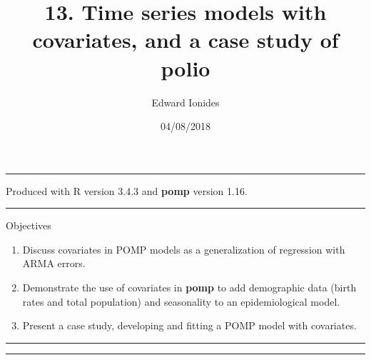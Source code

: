 \documentclass[]{article}
\title{13. Time series models with covariates, and a case study of polio}
\author{Edward Ionides}
\date{04/08/2018}
\begin{document}
\maketitle

{
\setcounter{tocdepth}{2}
\tableofcontents
}
\newcommand\prob{\mathbb{P}}
\newcommand\E{\mathbb{E}}
\newcommand\var{\mathrm{Var}}
\newcommand\cov{\mathrm{Cov}}
\newcommand\loglik{\ell}
\newcommand\R{\mathbb{R}}
\newcommand\data[1]{#1^*}
\newcommand\params{\, ; \,}
\newcommand\transpose{\scriptsize{T}}
\newcommand\eqspace{\quad\quad}
\newcommand\myeq[1]{\eqspace \displaystyle #1}
\newcommand\lik{\mathcal{L}}
\newcommand\profileloglik[1]{\ell^\mathrm{profile}_#1}
\newcommand\ar{\phi}
\newcommand\ma{\psi}
\newcommand\AR{\Phi}
\newcommand\MA{\Psi}
\newcommand\ev{u}
\newcommand\given{{\, | \,}}
\newcommand\equals{{=\,}}
\newcommand\matA{\mathbb{A}}
\newcommand\matB{\mathbb{B}}
\newcommand\matH{\mathbb{H}}
\newcommand\covmatX{\mathbb{U}}
\newcommand\covmatY{\mathbb{V}}




\begin{center}\rule{0.5\linewidth}{\linethickness}\end{center}

Produced with R version 3.4.3 and \textbf{pomp} version 1.16.

\begin{center}\rule{0.5\linewidth}{\linethickness}\end{center}

Objectives

\begin{enumerate}
\def\labelenumi{\arabic{enumi}.}
\item
  Discuss covariates in POMP models as a generalization of regression
  with ARMA errors.
\item
  Demonstrate the use of covariates in \textbf{pomp} to add demographic
  data (birth rates and total population) and seasonality to an
  epidemiological model.
\item
  Present a case study, developing and fitting a POMP model with
  covariates.
\end{enumerate}

\begin{center}\rule{0.5\linewidth}{\linethickness}\end{center}

\begin{center}\rule{0.5\linewidth}{\linethickness}\end{center}
\end{document}
